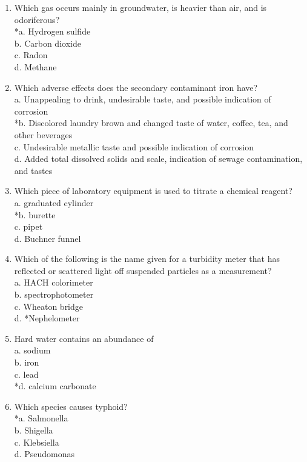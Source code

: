 \begin{enumerate}[1.]
  \item Which gas occurs mainly in groundwater, is heavier than air, and is odoriferous?\\
*a. Hydrogen sulfide\\
b. Carbon dioxide\\
c. Radon\\
d. Methane\\

 \item Which adverse effects does the secondary contaminant iron have?\\
a. Unappealing to drink, undesirable taste, and possible indication of corrosion\\
*b. Discolored laundry brown and changed taste of water, coffee, tea, and other beverages\\
c. Undesirable metallic taste and possible indication of corrosion\\
d. Added total dissolved solids and scale, indication of sewage contamination, and tastes 


  \item Which piece of laboratory equipment is used to titrate a chemical reagent?\\
a. graduated cylinder\\
*b. burette\\
c. pipet\\
d. Buchner funnel\\

  \item Which of the following is the name given for a turbidity meter that has reflected or scattered light off suspended particles as a measurement?\\
a. HACH colorimeter\\
b. spectrophotometer\\
c. Wheaton bridge\\
d. *Nephelometer\\

  \item Hard water contains an abundance of\\
a. sodium\\
b. iron\\
c. lead\\
*d. calcium carbonate\\

  \item Which species causes typhoid?\\
*a. Salmonella\\
b. Shigella\\
c. Klebsiella\\
d. Pseudomonas\\


\end{enumerate}
